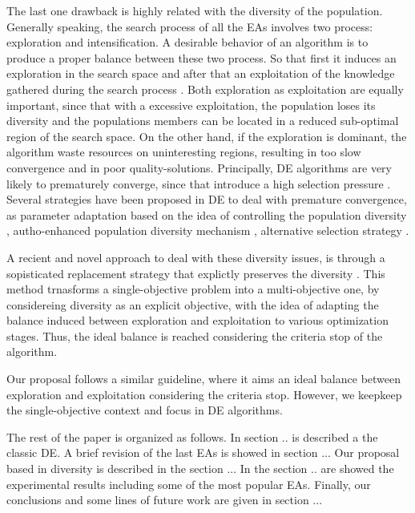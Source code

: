 %
The last one drawback is highly related with the diversity of the population.
%
Generally speaking, the search process of all the EAs involves two process: exploration and intensification.
%
A desirable behavior of an algorithm is to produce a proper balance between these two process.
%
So that first it induces an exploration in the search space and after that an exploitation of the knowledge gathered during the search process \cite{zaharie2003control}.
%
Both exploration as exploitation are equally important, since that with a excessive exploitation, the population loses its diversity and the populations members can be located in a reduced sub-optimal region of the search space.
%
On the other hand, if the exploration is dominant, the algorithm waste resources on uninteresting regions, resulting in too slow convergence and in poor quality-solutions.
%
Principally, DE algorithms are very likely to prematurely converge, since that introduce a high selection pressure \cite{sa2008exploration}.
%
Several strategies have been proposed in DE to deal with premature convergence, as parameter adaptation based on the idea of controlling the population diversity \cite{zaharie2003control}, autho-enhanced population diversity mechanism \cite{yang2015differential}, alternative selection strategy \cite{sa2008exploration}.


A recient and novel approach to deal with these diversity issues, is through a sopisticated replacement strategy that explictly preserves the diversity \cite{segura2016novel}.
%
This method trnasforms a single-objective problem into a multi-objective one, by considereing diversity as an explicit objective, with the idea of adapting the balance induced between exploration and exploitation to various optimization stages.
%
Thus, the ideal balance is reached considering the criteria stop of the algorithm.
%

Our proposal follows a similar guideline, where it aims an ideal balance between exploration and exploitation considering the criteria stop.
%
However, we keepkeep the single-objective context and focus in DE algorithms.



The rest of the paper is organized as follows.
%
In section .. is described a the classic DE.
%
A brief revision of the last EAs is showed in section ...
%
Our proposal based in diversity is described in the section ...
%
In the section .. are showed the experimental results including some of the most popular EAs.
%
Finally, our conclusions and some lines of future work are given in section ...
